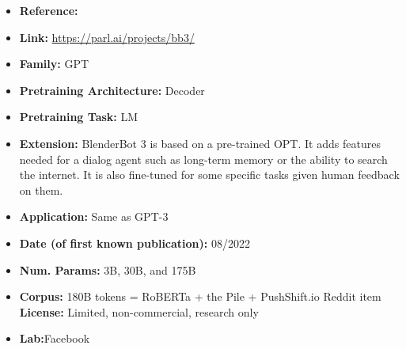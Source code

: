 \documentclass{article}
\begin{document}
            \begin{itemize}
                \item \textbf{Reference:} 
                \item \textbf{Link:} \url{https://parl.ai/projects/bb3/}
                \item \textbf{Family:} GPT 
                \item \textbf{Pretraining Architecture:} Decoder
                \item \textbf{Pretraining Task:} LM
                \item \textbf{Extension:} BlenderBot 3 is based on a pre-trained OPT. It adds features needed for a dialog agent such as long-term memory or the ability to search the internet. It is also fine-tuned for some specific tasks given human feedback on them.  
                \item \textbf{Application:} Same as GPT-3
                \item \textbf{Date (of first known publication):} 08/2022
                \item \textbf{Num. Params:} 3B, 30B, and 175B
                \item \textbf{Corpus:} 180B tokens = RoBERTa + the Pile + PushShift.io Reddit
                item \textbf{License:} Limited, non-commercial, research only
                \item \textbf{Lab:}Facebook
            \end{itemize}
\end{document}
